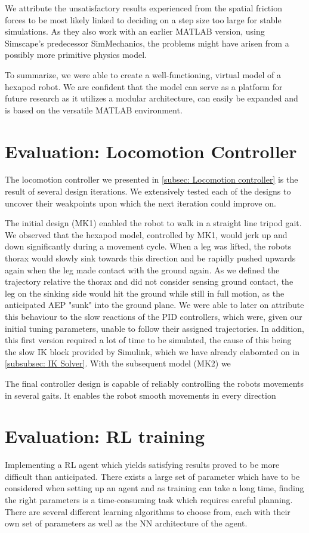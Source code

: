 We attribute the unsatisfactory results \cite{thilderkvist2015motion}  experienced from the spatial friction forces to be most likely linked to deciding on a step size too large for stable simulations.
As they also work with an earlier MATLAB version, using Simscape's predecessor SimMechanics, the problems might have arisen from a possibly more primitive physics model.

To summarize, we were able to create a well-functioning, virtual model of a hexapod robot.
We are confident that the model can serve as a platform for future research as it utilizes a modular architecture, can easily be expanded and is based on the versatile MATLAB  environment.
 

\section{Evaluation: Locomotion Controller}
The locomotion controller we presented in \ref{subsec: Locomotion controller} is the result of several design iterations.
We extensively tested each of the designs to uncover their weakpoints upon which the next iteration could improve on.

The initial design (MK1) enabled the robot to walk in a straight line tripod gait.
We observed that the hexapod model, controlled by MK1, would jerk up and down significantly during a movement cycle.
When a leg was lifted, the robots thorax would slowly sink towards this direction and be rapidly pushed upwards again when the leg made contact with the ground again.
As we defined the trajectory relative the thorax and did not consider sensing ground contact, the leg on the sinking side would hit the ground while still in full motion, as the anticipated AEP "sunk" into the ground plane.
We were able to later on attribute this behaviour to the slow reactions of the PID controllers, which were, given our initial tuning parameters, unable to follow their assigned trajectories. 
In addition, this first version required a lot of time to be simulated, the cause of this being the slow IK block provided by Simulink, which we have already elaborated on in \ref{subsubsec: IK Solver}.
With the subsequent model (MK2) we 

The final controller design is capable of reliably controlling the robots movements in several gaits.
It enables the robot smooth movements in every direction


\section{Evaluation: RL training}
Implementing a RL agent which yields satisfying results proved to be more difficult than anticipated.
There exists a large set of parameter which have to be considered when setting up an agent and as training can take a long time, finding the right parameters is a time-consuming task which requires careful planning.
There are several different learning algorithms to choose from, each with their own set of parameters as well as the NN architecture of the agent. 

